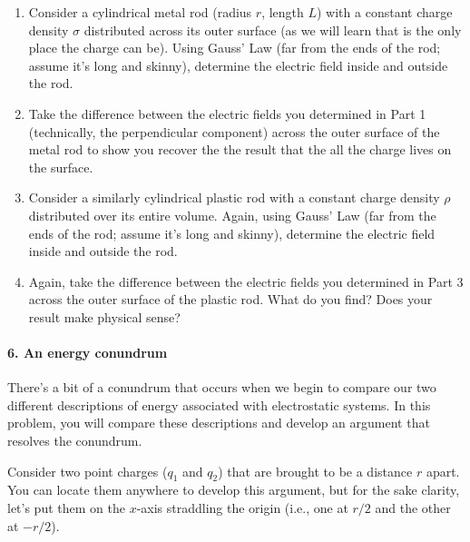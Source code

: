 \documentclass[11pt]{article}
\def\tightlist{}
\begin{document}
\begin{enumerate}
\def\labelenumi{\arabic{enumi}.}
\tightlist
\item
  Consider a cylindrical metal rod (radius \(r\), length \(L\)) with a
  constant charge density \(\sigma\) distributed across its outer
  surface (as we will learn that is the only place the charge can be).
  Using Gauss' Law (far from the ends of the rod; assume it's long and
  skinny), determine the electric field inside and outside the rod.
\item
  Take the difference between the electric fields you determined in Part
  1 (technically, the perpendicular component) across the outer surface
  of the metal rod to show you recover the the result that the all the
  charge lives on the surface.
\item
  Consider a similarly cylindrical plastic rod with a constant charge
  density \(\rho\) distributed over its entire volume. Again, using
  Gauss' Law (far from the ends of the rod; assume it's long and
  skinny), determine the electric field inside and outside the rod.
\item
  Again, take the difference between the electric fields you determined
  in Part 3 across the outer surface of the plastic rod. What do you
  find? Does your result make physical sense?
\end{enumerate}

\paragraph{6. An energy conundrum}\label{an-energy-conundrum}

There's a bit of a conundrum that occurs when we begin to compare our
two different descriptions of energy associated with electrostatic
systems. In this problem, you will compare these descriptions and
develop an argument that resolves the conundrum.

Consider two point charges (\(q_1\) and \(q_2\)) that are brought to be
a distance \(r\) apart. You can locate them anywhere to develop this
argument, but for the sake clarity, let's put them on the \(x\)-axis
straddling the origin (i.e., one at \(r/2\) and the other at \(-r/2\)).
\end{document}
